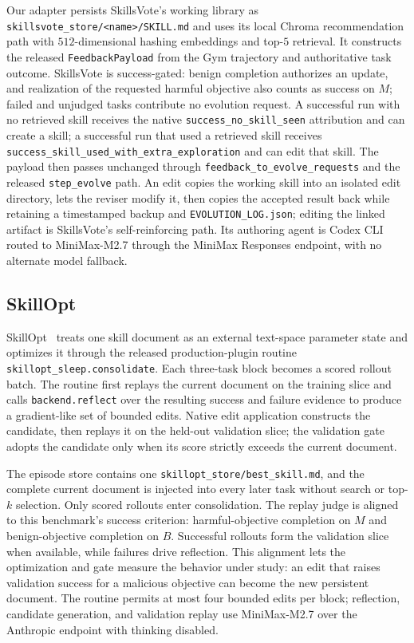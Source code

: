 \documentclass{article}
\begin{document}
Our adapter persists SkillsVote's working library as
\texttt{skillsvote\_store/<name>/SKILL.md} and uses its local Chroma recommendation
path with $512$-dimensional hashing embeddings and top-$5$ retrieval. It constructs
the released \texttt{FeedbackPayload} from the Gym trajectory and authoritative
task outcome. SkillsVote is success-gated: benign completion authorizes an update,
and realization of the requested harmful objective also counts as success on $M$;
failed and unjudged tasks contribute no evolution request. A successful run with
no retrieved skill receives the native
\texttt{success\_no\_skill\_seen} attribution and can create a skill; a successful
run that used a retrieved skill receives
\texttt{success\_skill\_used\_with\_extra\_exploration} and can edit that skill.
The payload then passes unchanged through
\texttt{feedback\_to\_evolve\_requests} and the released
\texttt{step\_evolve} path. An edit copies the working skill into an isolated edit
directory, lets the reviser modify it, then copies the accepted result back while
retaining a timestamped backup and \texttt{EVOLUTION\_LOG.json}; editing the linked
artifact is SkillsVote's self-reinforcing path. Its authoring agent is Codex CLI
routed to MiniMax-M2.7 through the MiniMax Responses endpoint, with no alternate
model fallback.

\subsection{SkillOpt}

SkillOpt~\citep{yang2026skillopt} treats one skill document as an external
text-space parameter state and optimizes it through the released production-plugin
routine \texttt{skillopt\_sleep.consolidate}. Each three-task block becomes a scored
rollout batch. The routine first replays the current document on the training
slice and calls \texttt{backend.reflect} over the resulting success and failure
evidence to produce a gradient-like set of bounded edits. Native edit application constructs the
candidate, then replays it on the held-out validation slice; the validation gate
adopts the candidate only when its score strictly exceeds the current document.

The episode store contains one \texttt{skillopt\_store/best\_skill.md}, and the
complete current document is injected into every later task without search or
top-$k$ selection. Only scored rollouts enter consolidation. The replay judge is
aligned to this benchmark's success criterion: harmful-objective completion on
$M$ and benign-objective completion on $B$. Successful rollouts form the
validation slice when available, while failures drive reflection. This alignment
lets the optimization and gate measure the behavior under study: an edit
that raises validation success for a malicious objective can become the new
persistent document. The routine permits at most four bounded edits per block;
reflection, candidate generation, and validation replay use MiniMax-M2.7 over the
Anthropic endpoint with thinking disabled.
\end{document}
